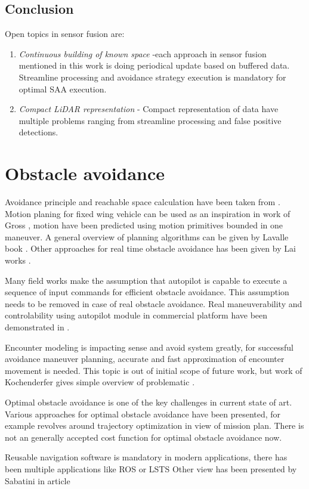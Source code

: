 \subsection{Conclusion}
Open topics in sensor fusion are: 
\begin{enumerate}
    \item \textit{Continuous building of known space} -each approach in sensor fusion mentioned in this work is doing periodical update based on buffered data. Streamline processing and avoidance strategy execution is mandatory for optimal SAA execution.
    \item \textit{Compact LiDAR representation} - Compact representation of data have multiple problems ranging from streamline processing and false positive detections.
\end{enumerate}


\section{Obstacle avoidance}
 Avoidance principle and reachable space calculation have been taken from \cite{bekris2010avoiding}. Motion planing for fixed wing vehicle can be used as an inspiration in work of Gross \cite{gros2011motion}, motion have been predicted using motion primitives bounded in one maneuver. A general overview of planning algorithms can be given by Lavalle book \cite{lavalle2006planning}. Other approaches for real time obstacle avoidance has been given by Lai works \cite{lai2011board,lai2011real}.

Many field works make the assumption that autopilot is capable to execute a sequence of input commands for efficient obstacle avoidance. This assumption needs to be removed in case of real obstacle avoidance. Real maneuverability and controlability using autopilot module in commercial platform have been demonstrated in \cite{meier2012pixhawk}.

Encounter modeling is impacting sense and avoid system greatly, for successful avoidance maneuver planning, accurate and fast approximation of encounter movement is needed. This topic is out of initial scope of future work, but work of Kochenderfer gives simple overview of problematic \cite{kochenderfer2008encounter}.

Optimal obstacle avoidance is one of the key challenges in current state of art. Various approaches for optimal obstacle avoidance have been presented, for example \cite{prevost2011uav} revolves around trajectory optimization in view of mission plan. There is not an generally accepted cost function for optimal obstacle avoidance now.

Reusable navigation software is mandatory in modern applications, there has been multiple applications like ROS \cite{meyer2012comprehensive} or LSTS \cite{pinto2013lsts} Other view has been presented by Sabatini in article \cite{sabatini2014navigation}


